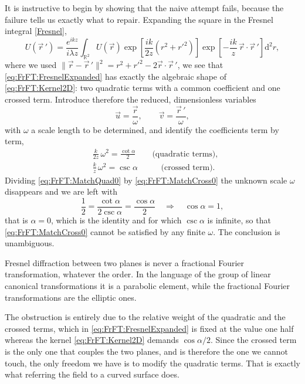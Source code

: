			It is instructive to begin by showing that the naive attempt fails, because the failure tells us exactly what to repair. Expanding the square in the Fresnel integral \eqref{Fresnel},
			\begin{equation}\label{eq:FrFT:FresnelExpanded}
				U(\vec{r}\,') = \frac{e^{ikz}}{i\lambda z}\int_{\mathbb{R}^{2}} U(\vec{r})\exp\left[\frac{ik}{2z}\left(r^{2}+r'^{2}\right)\right]\exp\left[-\frac{ik}{z}\,\vec{r}\cdot\vec{r}\,'\right]\mathrm{d}^{2}r,
			\end{equation}
			where we used $\|\vec{r}-\vec{r}\,'\|^{2} = r^{2}+r'^{2}-2\vec{r}\cdot\vec{r}\,'$, we see that \eqref{eq:FrFT:FresnelExpanded} has exactly the algebraic shape of \eqref{eq:FrFT:Kernel2D}: two quadratic terms with a common coefficient and one crossed term. Introduce therefore the reduced, dimensionless variables
			\begin{equation}\label{eq:FrFT:Reduced}
				\vec{u} = \frac{\vec{r}}{\omega}, \qquad \vec{v} = \frac{\vec{r}\,'}{\omega},
			\end{equation}
			with $\omega$ a scale length to be determined, and identify the coefficients term by term,
			\begin{align}
				& \frac{k}{2z}\,\omega^{2} = \frac{\cot\alpha}{2} \qquad \text{(quadratic terms)},\label{eq:FrFT:MatchQuad0}\\
				& \frac{k}{z}\,\omega^{2} = \csc\alpha \qquad\;\;\; \text{(crossed term)}.\label{eq:FrFT:MatchCross0}
			\end{align}
			Dividing \eqref{eq:FrFT:MatchQuad0} by \eqref{eq:FrFT:MatchCross0} the unknown scale $\omega$ disappears and we are left with
			\begin{equation*}
				\frac{1}{2} = \frac{\cot\alpha}{2\csc\alpha} = \frac{\cos\alpha}{2} \quad\Longrightarrow\quad \cos\alpha = 1,
			\end{equation*}
			that is $\alpha = 0$, which is the identity and for which $\csc\alpha$ is infinite, so that \eqref{eq:FrFT:MatchCross0} cannot be satisfied by any finite $\omega$. The conclusion is unambiguous.

			\begin{myteo}
				Fresnel diffraction between two planes is never a fractional Fourier transformation, whatever the order. In the language of the group of linear canonical transformations it is a parabolic element, while the fractional Fourier transformations are the elliptic ones.
			\end{myteo}

			The obstruction is entirely due to the relative weight of the quadratic and the crossed terms, which in \eqref{eq:FrFT:FresnelExpanded} is fixed at the value one half whereas the kernel \eqref{eq:FrFT:Kernel2D} demands $\cos\alpha/2$. Since the crossed term is the only one that couples the two planes, and is therefore the one we cannot touch, the only freedom we have is to modify the quadratic terms. That is exactly what referring the field to a curved surface does.

